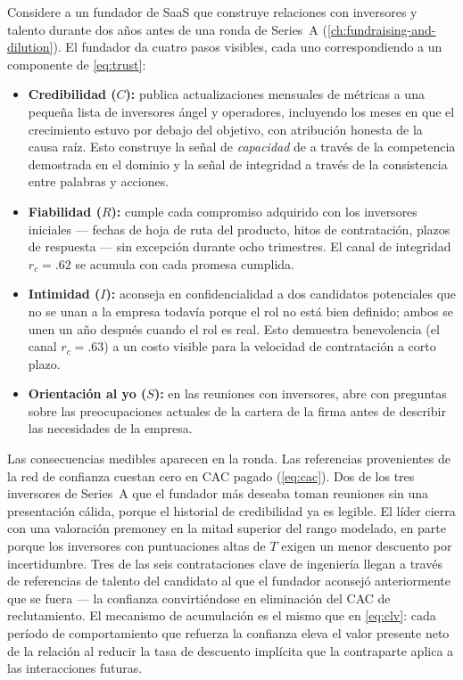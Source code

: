 \begin{example}
Considere a un fundador de SaaS que construye relaciones con inversores y talento durante dos
años antes de una ronda de Series~A (\cref{ch:fundraising-and-dilution}). El fundador da cuatro
pasos visibles, cada uno correspondiendo a un componente de \cref{eq:trust}:

\begin{itemize}
  \item \textbf{Credibilidad (\(C\)):} publica actualizaciones mensuales de métricas a una
    pequeña lista de inversores ángel y operadores, incluyendo los meses en que el crecimiento
    estuvo por debajo del objetivo, con atribución honesta de la causa raíz. Esto construye la
    señal de \emph{capacidad} de \textcite{mayer1995model} a través de la competencia demostrada
    en el dominio y la señal de integridad a través de la consistencia entre palabras y acciones.
  \item \textbf{Fiabilidad (\(R\)):} cumple cada compromiso adquirido con los inversores iniciales
    --- fechas de hoja de ruta del producto, hitos de contratación, plazos de respuesta ---
    sin excepción durante ocho trimestres. El canal de integridad $r_c = .62$
    \parencite{colquitt2007meta} se acumula con cada promesa cumplida.
  \item \textbf{Intimidad (\(I\)):} aconseja en confidencialidad a dos candidatos potenciales que
    no se unan a la empresa todavía porque el rol no está bien definido; ambos se unen un año
    después cuando el rol es real. Esto demuestra benevolencia (el canal $r_c = .63$) a un costo
    visible para la velocidad de contratación a corto plazo.
  \item \textbf{Orientación al yo (\(S\)):} en las reuniones con inversores, abre con preguntas
    sobre las preocupaciones actuales de la cartera de la firma antes de describir las necesidades
    de la empresa.
\end{itemize}

Las consecuencias medibles aparecen en la ronda. Las referencias provenientes de la red de
confianza cuestan cero en CAC pagado (\cref{eq:cac}). Dos de los tres inversores de Series~A
que el fundador más deseaba toman reuniones sin una presentación cálida, porque el historial de
credibilidad ya es legible. El líder cierra con una valoración premoney en la mitad superior del
rango modelado, en parte porque los inversores con puntuaciones altas de \(T\) exigen un menor
descuento por incertidumbre. Tres de las seis contrataciones clave de ingeniería llegan a través
de referencias de talento del candidato al que el fundador aconsejó anteriormente que se fuera
--- la confianza convirtiéndose en eliminación del CAC de reclutamiento. El mecanismo de
acumulación es el mismo que en \cref{eq:clv}: cada período de comportamiento que refuerza la
confianza eleva el valor presente neto de la relación al reducir la tasa de descuento implícita
que la contraparte aplica a las interacciones futuras.
\end{example}
